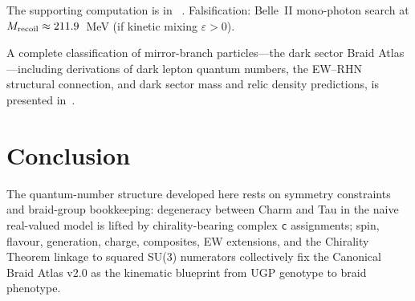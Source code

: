 \documentclass[11pt]{article}
\theoremstyle{remark}
\begin{document}
\begin{center}
\renewcommand{\arraystretch}{1.15}
\footnotesize
{}
\end{center}

\begin{sloppypar}
The supporting computation is in ~\cite{SpivackGTESpectrum}.
Falsification: Belle~II mono-photon search at $M_{\rm recoil} \approx 211.9$~MeV (if kinetic mixing $\varepsilon > 0$).
\end{sloppypar}

\begin{sloppypar}
A complete classification of mirror-branch particles---the dark sector Braid Atlas---including derivations of dark lepton quantum numbers, the EW--RHN structural connection, and dark sector mass and relic density predictions, is presented in~\cite{SpivackMirrorBraidAtlas}.
\end{sloppypar}

\section{Conclusion}
\label{sec:conclusion}

The quantum-number structure developed here rests on symmetry constraints and braid-group bookkeeping: degeneracy between Charm and Tau in the naive real-valued model is lifted by chirality-bearing complex \texttt{c} assignments; spin, flavour, generation, charge, composites, EW extensions, and the Chirality Theorem linkage to squared SU(3) numerators collectively fix the Canonical Braid Atlas v2.0 as the kinematic blueprint from UGP genotype to braid phenotype.
\end{document}

